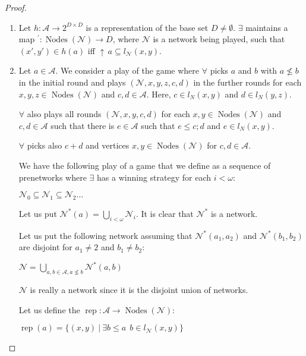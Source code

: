 \documentclass[a4paper]{article}
\theoremstyle{definition}
\theoremstyle{theorem}
\theoremstyle{proposition}
\theoremstyle{lemma}
\theoremstyle{ex}
\theoremstyle{corollary}
\theoremstyle{claim}
\newcommand{\up}[1]{\ensuremath{{\uparrow}\,#1}}
\begin{document}
\begin{proof}
$ $

  \begin{enumerate}
    \item Let $h : \mathcal{A} \to 2^{D \times D}$ is a representation of the base set $D \neq \emptyset$. $\exists$ maintains a map ${}^{'} : \operatorname{Nodes}(\mathcal{N}) \to D$, where $\mathcal{N}$ is a network being played, such that $(x',y') \in h(a)$ iff $\up a \subseteq l_{\mathcal{N}}(x,y)$.

    \item
    Let $a \in \mathcal{A}$. We consider a play of the game where $\forall$ picks $a$ and $b$ with $a \not\leq b$ in the initial round and plays $(\mathcal{N}, x, y, z, c, d)$ in the further rounds for each $x, y, z \in \operatorname{Nodes}(\mathcal{N})$ and $c,d \in \mathcal{A}$. Here, $c \in l_N(x, y)$ and $d \in l_N(y, z)$.

    $\forall$ also plays all rounds $(\mathcal{N},x,y,c,d)$ for each $x, y \in \operatorname{Nodes}(\mathcal{N})$ and $c,d \in \mathcal{A}$ such that there is $e \in \mathcal{A}$ such that
    $e \leq c ; d$ and $e \in l_N(x,y)$.

    $\forall$ picks also $c + d$ and vertices $x,y \in \operatorname{Nodes}(\mathcal{N})$ for $c, d \in \mathcal{A}$.

    We have the following play of a game that we define as a sequence of prenetworks where $\exists$ has a winning strategy for each $i < \omega$:

    \begin{center}
      $\mathcal{N}_0 \subseteq \mathcal{N}_1 \subseteq \mathcal{N}_2 \dots$
    \end{center}

    Let us put $\mathcal{N}^{*}(a) = \bigcup \limits_{i < \omega} \mathcal{N}_i$. It is clear that $\mathcal{N}^{*}$ is a network.

    Let us put the following network assuming that $\mathcal{N}^{*}(a_1, a_2)$ and $\mathcal{N}^{*}(b_1, b_2)$ are disjoint for $a_1 \neq 2$ and $b_1 \neq b_2$:

    \begin{center}
      $\mathcal{N} = \bigcup \limits_{a,b \in \mathcal{A}, a \not\leq b} \mathcal{N}^{*}(a,b)$
    \end{center}

    $\mathcal{N}$ is really a network since it is the disjoint union of networks.

    Let us define the $\operatorname{rep} : \mathcal{A} \to \operatorname{Nodes}(\mathcal{N})$:
    \begin{center}
      $\operatorname{rep}(a) = \{ (x, y) \: | \: \exists b \leq a \:\: b \in l_{\mathcal{N}}(x, y)\}$
    \end{center}


\end{enumerate}
\end{proof}
\end{document}
